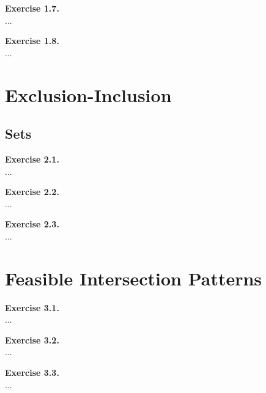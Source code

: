 \documentclass{article}
\begin{document}
\begin{flushleft}
\textbf{Exercise 1.7.} \\
...

\textbf{Exercise 1.8.} \\
...

\end{flushleft}
\section{Exclusion-Inclusion}
\subsection{Sets}

\begin{flushleft}
\textbf{Exercise 2.1.} \\
...

\textbf{Exercise 2.2.} \\
...

\textbf{Exercise 2.3.} \\
...

\end{flushleft}
\section{Feasible Intersection Patterns}

\begin{flushleft}
\textbf{Exercise 3.1.} \\
...

\textbf{Exercise 3.2.} \\
...

\textbf{Exercise 3.3.} \\
...
\end{flushleft}
\end{document}
